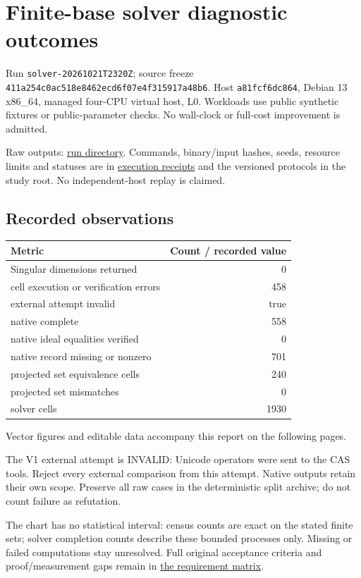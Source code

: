 \documentclass[
  10pt,
  letterpaper,
  landscape]{article}
\author{}
\date{}
\begin{document}
\section{Finite-base solver diagnostic
outcomes}\label{finite-base-solver-diagnostic-outcomes}

Run \texttt{solver-20261021T2320Z}; source freeze
\texttt{411a254c0ac518e8462ecd6f07e4f315917a48b6}. Host
\texttt{a81fcf6dc864}, Debian 13 x86\_64, managed four-CPU virtual host,
L0. Workloads use public synthetic fixtures or public-parameter checks.
No wall-clock or full-cost improvement is admitted.

Raw outputs:
\href{../../../execution-v1/runs/solver-20261021T2320Z/}{run directory}.
Commands, binary/input hashes, seeds, resource limits and statuses are
in \href{../../../execution-v1/}{execution receipts} and the versioned
protocols in the study root. No independent-host replay is claimed.

\subsection{Recorded observations}\label{recorded-observations}

\begin{longtable}[]{@{}lr@{}}
\toprule\noalign{}
Metric & Count / recorded value \\
\midrule\noalign{}
\endhead
\bottomrule\noalign{}
\endlastfoot
Singular dimensions returned & 0 \\
cell execution or verification errors & 458 \\
external attempt invalid & true \\
native complete & 558 \\
native ideal equalities verified & 0 \\
native record missing or nonzero & 701 \\
projected set equivalence cells & 240 \\
projected set mismatches & 0 \\
solver cells & 1930 \\
\end{longtable}

Vector figures and editable data accompany this report on the following pages.

The V1 external attempt is INVALID: Unicode operators were sent to the
CAS tools. Reject every external comparison from this attempt. Native
outputs retain their own scope. Preserve all raw cases in the
deterministic split archive; do not count failure as refutation.

The chart has no statistical interval: census counts are exact on the
stated finite sets; solver completion counts describe these bounded
processes only. Missing or failed computations stay unresolved. Full
original acceptance criteria and proof/measurement gaps remain in
\href{../../../EXPERIMENTS.md}{the requirement matrix}.
\end{document}

